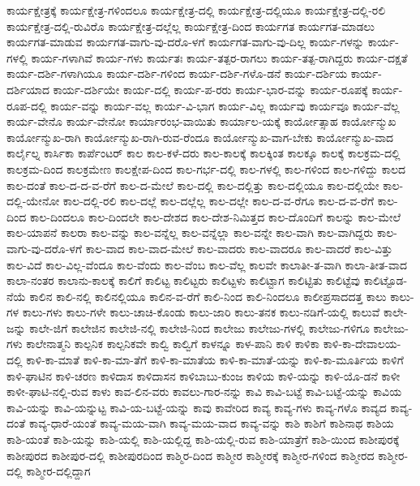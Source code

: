 {ಕಾರ್ಯಕ್ಷೇತ್ರಕ್ಕೆ
ಕಾರ್ಯಕ್ಷೇತ್ರ-ಗಳಿಂದಲೂ
ಕಾರ್ಯಕ್ಷೇತ್ರ-ದಲ್ಲಿ
ಕಾರ್ಯಕ್ಷೇತ್ರ-ದಲ್ಲಿಯೂ
ಕಾರ್ಯಕ್ಷೇತ್ರ-ದಲ್ಲಿ-ರಲಿ
ಕಾರ್ಯಕ್ಷೇತ್ರ-ದಲ್ಲಿ-ರುವಿರೊ
ಕಾರ್ಯಕ್ಷೇತ್ರ-ದಲ್ಲೆಲ್ಲ
ಕಾರ್ಯಕ್ಷೇತ್ರ-ದಿಂದ
ಕಾರ್ಯಗತ
ಕಾರ್ಯಗತ-ಮಾಡಲು
ಕಾರ್ಯಗತ-ಮಾಡುವ
ಕಾರ್ಯಗತ-ವಾಗು-ವು-ದರೊ-ಳಗೆ
ಕಾರ್ಯಗತ-ವಾಗು-ವು-ದಿಲ್ಲ
ಕಾರ್ಯ-ಗಳನ್ನು
ಕಾರ್ಯ-ಗಳಲ್ಲಿ
ಕಾರ್ಯ-ಗಳಾಗಿವೆ
ಕಾರ್ಯ-ಗಳು
ಕಾರ್ಯತಃ
ಕಾರ್ಯ-ತತ್ಪರ-ರಾಗಲು
ಕಾರ್ಯ-ತತ್ಪ-ರಾಗಿದ್ದರು
ಕಾರ್ಯ-ದಕ್ಷತೆ
ಕಾರ್ಯ-ದರ್ಶಿ-ಗಳಾಗಿಯೂ
ಕಾರ್ಯ-ದರ್ಶಿ-ಗಳಿಂದ
ಕಾರ್ಯ-ದರ್ಶಿ-ಗಳೊ-ಡನೆ
ಕಾರ್ಯ-ದರ್ಶಿಯ
ಕಾರ್ಯ-ದರ್ಶಿಯಾದ
ಕಾರ್ಯ-ದರ್ಶಿಯೇ
ಕಾರ್ಯ-ದಲ್ಲಿ
ಕಾರ್ಯ-ಪ-ರರು
ಕಾರ್ಯ-ಭಾರ-ವನ್ನು
ಕಾರ್ಯ-ರೂಪಕ್ಕೆ
ಕಾರ್ಯ-ರೂಪ-ದಲ್ಲಿ
ಕಾರ್ಯ-ವನ್ನು
ಕಾರ್ಯ-ವಲ್ಲ
ಕಾರ್ಯ-ವಿ-ಭಾಗ
ಕಾರ್ಯ-ವಿಲ್ಲ
ಕಾರ್ಯವು
ಕಾರ್ಯವೂ
ಕಾರ್ಯ-ವೆಲ್ಲ
ಕಾರ್ಯ-ವೇನೊ
ಕಾರ್ಯ-ವೇನೋ
ಕಾರ್ಯಾರಂಭ-ವಾಯಿತು
ಕಾರ್ಯಾಲ-ಯಕ್ಕೆ
ಕಾರ್ಯೋತ್ಸಾಹ
ಕಾರ್ಯೋನ್ಮುಖ
ಕಾರ್ಯೋನ್ಮುಖ-ರಾಗಿ
ಕಾರ್ಯೋನ್ಮುಖ-ರಾಗಿ-ರುವ-ರೆಂದೂ
ಕಾರ್ಯೋನ್ಮುಖ-ವಾಗ-ಬೇಕು
ಕಾರ್ಯೋನ್ಮುಖ-ವಾದ
ಕಾರ್ಲೈಲ್ನ
ಕಾರ್ಸಿಕಾ
ಕಾರ್ಪೆಂಟರ್
ಕಾಲ
ಕಾಲ-ಕಳೆ-ದರು
ಕಾಲ-ಕಾಲಕ್ಕೆ
ಕಾಲಕ್ಕಿಂತ
ಕಾಲಕ್ಕೂ
ಕಾಲಕ್ಕೆ
ಕಾಲಕ್ರಮ-ದಲ್ಲಿ
ಕಾಲಕ್ರಮ-ದಿಂದ
ಕಾಲಕ್ರಮೇಣ
ಕಾಲಕ್ಷೇಪ-ದಿಂದ
ಕಾಲ-ಗರ್ಭ-ದಲ್ಲಿ
ಕಾಲ-ಗಳಲ್ಲಿ
ಕಾಲ-ಗಳಿಂದ
ಕಾಲ-ಗಳಿದ್ದು
ಕಾಲದ
ಕಾಲ-ದಂತೆ
ಕಾಲ-ದ-ದ-ವ-ರೆಗೆ
ಕಾಲ-ದ-ಮೇಲೆ
ಕಾಲ-ದಲ್ಲಿ
ಕಾಲ-ದಲ್ಲಿತ್ತು
ಕಾಲ-ದಲ್ಲಿಯೂ
ಕಾಲ-ದಲ್ಲಿಯೇ
ಕಾಲ-ದಲ್ಲಿ-ಯೇನೋ
ಕಾಲ-ದಲ್ಲಿ-ರಲಿ
ಕಾಲ-ದಲ್ಲೆ
ಕಾಲ-ದಲ್ಲೆಲ್ಲ
ಕಾಲ-ದಲ್ಲೇ
ಕಾಲ-ದ-ವ-ರೆಗೂ
ಕಾಲ-ದ-ವ-ರೆಗೆ
ಕಾಲ-ದಿಂದ
ಕಾಲ-ದಿಂದಲೂ
ಕಾಲ-ದಿಂದಲೇ
ಕಾಲ-ದೇಶದ
ಕಾಲ-ದೇಶ-ನಿಮಿತ್ತದ
ಕಾಲ-ದೊಂದಿಗೆ
ಕಾಲನ್ನು
ಕಾಲ-ಮೇಲೆ
ಕಾಲ-ಯಾಪನೆ
ಕಾಲರಾ
ಕಾಲ-ವನ್ನು
ಕಾಲ-ವನ್ನೆಲ್ಲ
ಕಾಲ-ವನ್ನೆಲ್ಲಾ
ಕಾಲ-ವನ್ನೇ
ಕಾಲ-ವಾಗಿ
ಕಾಲ-ವಾಗಿದ್ದರು
ಕಾಲ-ವಾಗು-ವು-ದರೊ-ಳಗೆ
ಕಾಲ-ವಾದ
ಕಾಲ-ವಾದ-ಮೇಲೆ
ಕಾಲ-ವಾದರು
ಕಾಲ-ವಾದರೂ
ಕಾಲ-ವಾದರೆ
ಕಾಲ-ವಿತ್ತು
ಕಾಲ-ವಿದೆ
ಕಾಲ-ವಿಲ್ಲ-ವೆಂದೂ
ಕಾಲ-ವೆಂದು
ಕಾಲ-ವೆಂಬ
ಕಾಲ-ವೆಲ್ಲ
ಕಾಲವೇ
ಕಾಲಾತೀ-ತ-ವಾಗಿ
ಕಾಲಾ-ತೀತ-ವಾದ
ಕಾಲಾ-ನಂತರ
ಕಾಲಾನು-ಕಾಲಕ್ಕೆ
ಕಾಲಿಗೆ
ಕಾಲಿಟ್ಟ
ಕಾಲಿಟ್ಟರು
ಕಾಲಿಟ್ಟಳು
ಕಾಲಿಟ್ಟಾಗ
ಕಾಲಿಟ್ಟಿತು
ಕಾಲಿಟ್ಟೆವು
ಕಾಲಿಟ್ಟೊಡ-ನೆಯೆ
ಕಾಲಿನ
ಕಾಲಿ-ನಲ್ಲಿ
ಕಾಲಿನಲ್ಲಿಯೂ
ಕಾಲಿನ-ವ-ರೆಗೆ
ಕಾಲಿ-ನಿಂದ
ಕಾಲಿ-ನಿಂದಲೂ
ಕಾಲೀಪ್ರಸಾದದತ್ತ
ಕಾಲು
ಕಾಲು-ಗಳ
ಕಾಲು-ಗಳು
ಕಾಲು-ಗಳೇ
ಕಾಲು-ಚಾಚಿ-ಕೊಂಡು
ಕಾಲು-ಜಾರಿ
ಕಾಲು-ತನಕ
ಕಾಲು-ನಡಿಗೆ-ಯಲ್ಲಿ
ಕಾಲುವೆ
ಕಾಲೇ-ಜನ್ನು
ಕಾಲೇ-ಜಿಗೆ
ಕಾಲೇಜಿನ
ಕಾಲೇಜಿ-ನಲ್ಲಿ
ಕಾಲೇಜಿ-ನಿಂದ
ಕಾಲೇಜು
ಕಾಲೇಜು-ಗಳಲ್ಲಿ
ಕಾಲೇಜು-ಗಳಿಗೂ
ಕಾಲೇಜು-ಗಳು
ಕಾಲೇನಾತ್ಮನಿ
ಕಾಲ್ಪನಿಕ
ಕಾಲ್ಪನಿಕವೇ
ಕಾಲ್ವಿ
ಕಾಲ್ವಿಗೆ
ಕಾಳನ್ನೂ
ಕಾಳ-ಪಾನಿ
ಕಾಳಿ
ಕಾಳಿಕಾ
ಕಾಳಿ-ಕಾ-ದೇವಾಲಯ-ದಲ್ಲಿ
ಕಾಳಿ-ಕಾ-ಮಾತೆ
ಕಾಳಿ-ಕಾ-ಮಾ-ತೆಗೆ
ಕಾಳಿ-ಕಾ-ಮಾತೆಯ
ಕಾಳಿ-ಕಾ-ಮಾತೆ-ಯನ್ನು
ಕಾಳಿ-ಕಾ-ಮೂರ್ತಿಯ
ಕಾಳಿಗೆ
ಕಾಳಿ-ಘಾಟಿನ
ಕಾಳಿ-ಚರಣ
ಕಾಳಿದಾಸ
ಕಾಳಿದಾಸನ
ಕಾಳಿಬಾಬು-ಕುಂಜ
ಕಾಳಿಯ
ಕಾಳಿ-ಯನ್ನು
ಕಾಳಿ-ಯೊ-ಡನೆ
ಕಾಳೀ
ಕಾಳೀ-ಘಾಟಿ-ನಲ್ಲಿ-ರುವ
ಕಾಳು
ಕಾವ-ಲಿನ-ವರು
ಕಾವಲು-ಗಾರ-ನನ್ನು
ಕಾವಿ
ಕಾವಿ-ಬಟ್ಟೆ
ಕಾವಿ-ಬಟ್ಟೆ-ಯನ್ನು
ಕಾವಿಯ
ಕಾವಿ-ಯನ್ನು
ಕಾವಿ-ಯನ್ನುಟ್ಟ
ಕಾವಿ-ಯ-ಬಟ್ಟೆ-ಯನ್ನು
ಕಾವು
ಕಾವೇರಿದ
ಕಾವ್ಯ
ಕಾವ್ಯ-ಗಳು
ಕಾವ್ಯ-ಗಳೊ
ಕಾವ್ಯದ
ಕಾವ್ಯ-ದಂತೆ
ಕಾವ್ಯ-ಧಾರೆ-ಯಂತೆ
ಕಾವ್ಯ-ಮಯ-ವಾಗಿ
ಕಾವ್ಯ-ಮಯ-ವಾದ
ಕಾವ್ಯ-ವನ್ನು
ಕಾಶಿ
ಕಾಶಿಗೆ
ಕಾಶಿನಾಥ
ಕಾಶಿಯ
ಕಾಶಿ-ಯಂತೆ
ಕಾಶಿ-ಯನ್ನು
ಕಾಶಿ-ಯಲ್ಲಿ
ಕಾಶಿ-ಯಲ್ಲಿದ್ದ
ಕಾಶಿ-ಯಲ್ಲಿ-ರುವ
ಕಾಶಿ-ಯಾತ್ರೆಗೆ
ಕಾಶಿ-ಯಿಂದ
ಕಾಶೀಪುರಕ್ಕೆ
ಕಾಶೀಪುರದ
ಕಾಶೀಪುರ-ದಲ್ಲಿ
ಕಾಶೀಪುರದಿಂದ
ಕಾಶ್ಮಿರ-ದಿಂದ
ಕಾಶ್ಮೀರ
ಕಾಶ್ಮೀರಕ್ಕೆ
ಕಾಶ್ಮೀರ-ಗಳಿಂದ
ಕಾಶ್ಮೀರದ
ಕಾಶ್ಮೀರ-ದಲ್ಲಿ
ಕಾಶ್ಮೀರ-ದಲ್ಲಿದ್ದಾಗ
}
